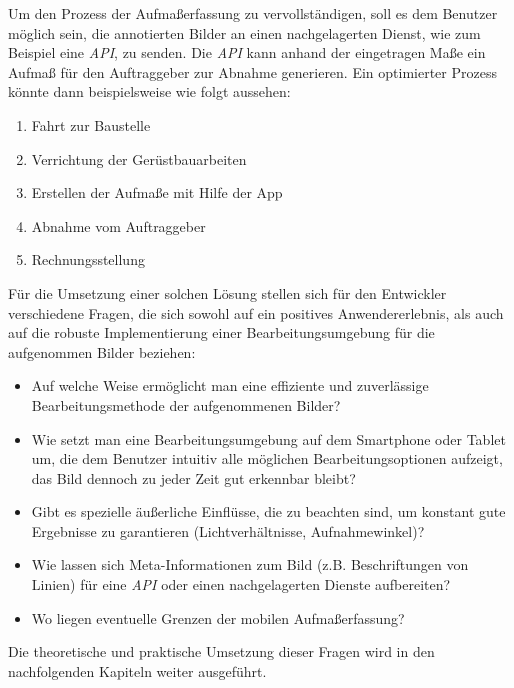 Um den Prozess der Aufmaßerfassung zu vervollständigen, soll es dem Benutzer möglich sein, die annotierten Bilder an einen nachgelagerten Dienst, wie zum Beispiel eine \emph{API}, zu senden.
Die \emph{API} kann anhand der eingetragen Maße ein Aufmaß für den Auftraggeber zur Abnahme generieren.
Ein optimierter Prozess könnte dann beispielsweise wie folgt aussehen:
\begin{enumerate}
  \item Fahrt zur Baustelle
  \item Verrichtung der Gerüstbauarbeiten
  \item Erstellen der Aufmaße mit Hilfe der App
  \item Abnahme vom Auftraggeber
  \item Rechnungsstellung
\end{enumerate} 

\noindent
Für die Umsetzung einer solchen Lösung stellen sich für den Entwickler verschiedene Fragen, die sich sowohl auf ein positives Anwendererlebnis, als auch auf die robuste Implementierung einer Bearbeitungsumgebung für die aufgenommen Bilder beziehen:

\begin{itemize}
  \item Auf welche Weise ermöglicht man eine effiziente und zuverlässige Bearbeitungsmethode der aufgenommenen Bilder?
  \item Wie setzt man eine Bearbeitungsumgebung auf dem Smartphone oder Tablet um, die dem Benutzer intuitiv alle möglichen Bearbeitungsoptionen aufzeigt, das Bild dennoch zu jeder Zeit gut erkennbar bleibt?
  \item Gibt es spezielle äußerliche Einflüsse, die zu beachten sind, um konstant gute Ergebnisse zu garantieren (Lichtverhältnisse, Aufnahmewinkel)?
  \item Wie lassen sich Meta-Informationen zum Bild (z.B. Beschriftungen von Linien) für eine \emph{API} oder einen nachgelagerten Dienste aufbereiten?
  \item Wo liegen eventuelle Grenzen der mobilen Aufmaßerfassung?
\end{itemize}

\noindent
Die theoretische und praktische Umsetzung dieser Fragen wird in den nachfolgenden Kapiteln weiter ausgeführt.
